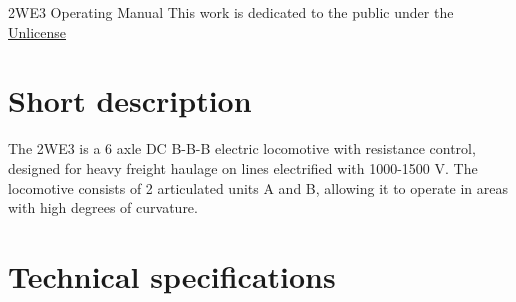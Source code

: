 \documentclass[11pt, a4paper]{article}
\begin{document}
\begin{titlepage}
    \centering
    \vspace*{1cm}
    {\Huge 2WE3 Operating Manual}
    \vspace{2cm}
    \tableofcontents
    \vfill
    This work is dedicated to the public under the \href{https://unlicense.org/}{Unlicense}
\end{titlepage}

\section{Short description}

The 2WE3 is a 6 axle DC B-B-B electric locomotive with resistance control, designed for heavy freight haulage on lines electrified with 1000-1500 V. The locomotive consists of 2 articulated units A and B, allowing it to operate in areas with high degrees of curvature.

\section{Technical specifications}
\end{document}
